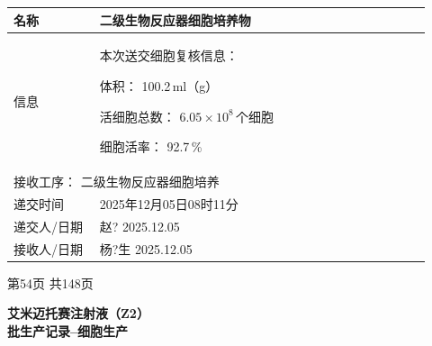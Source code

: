 \documentclass[UTF8,10pt,a4paper,fontset=fandol]{ctexart}
\newcommand{\fieldvalue}[1]{#1}
\newcommand{\handwritten}[1]{#1}
\begin{document}
\vspace{6pt}

\begin{tabular}{|p{0.19\linewidth}|p{0.73\linewidth}|}
\hline
名称 &
\fieldvalue{二级生物反应器细胞培养物}
\\ \hline
信息 &
本次送交细胞复核信息：\par
体积：
\fieldvalue{\handwritten{100.2}}\,ml（g）\par
活细胞总数：
\fieldvalue{\handwritten{$6.05\times10^{8}$}}\,个细胞\par
细胞活率：
\fieldvalue{\handwritten{92.7}}\,\%
\\ \hline
\multicolumn{2}{|l|}{
接收工序：
\fieldvalue{二级生物反应器细胞培养}
}
\\ \hline
递交时间 &
\fieldvalue{\handwritten{2025年12月05日08时11分}}
\\ \hline
递交人/日期 &
\fieldvalue{\handwritten{赵?}}\quad
\fieldvalue{\handwritten{2025.12.05}}
\\ \hline
接收人/日期 &
\fieldvalue{\handwritten{杨?生}}\quad
\fieldvalue{\handwritten{2025.12.05}}
\\ \hline
\end{tabular}

\vfill

\begin{center}
第54页 共148页
\end{center}

\newpage

\begin{center}
{\Large \textbf{艾米迈托赛注射液（Z2）}}\\[1em]
{\Large \textbf{批生产记录--细胞生产}}
\end{center}
\end{document}
